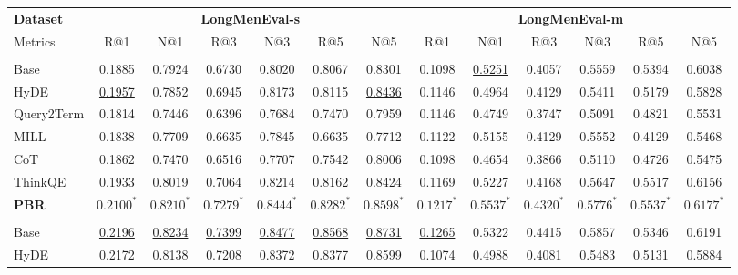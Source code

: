 \begin{table}[ht]
\centering
\small
\setlength\tabcolsep{2.2pt}  %
\renewcommand{\arraystretch}{0.80} %
\begin{tabular}{lcccccccccccc}
\toprule
 \textbf{Dataset} & \multicolumn{6}{c}{\textbf{LongMenEval-s}} & \multicolumn{6}{c}{\textbf{LongMenEval-m}} \\
 \cmidrule(lr){2-7} \cmidrule(lr){8-13}
Metrics & R@1 & N@1 & R@3 & N@3 & R@5 & N@5 & R@1 & N@1 & R@3 & N@3 & R@5 & N@5 \\
\midrule
\rowcolor{gray!15}
\multicolumn{13}{c}{\textit{multi-qa-MiniLM-L6-cos-v1}} \\
Base     & 0.1885 & 0.7924 & 0.6730 & 0.8020 & 0.8067 & 0.8301 & 0.1098 & \underline{0.5251} & 0.4057 & 0.5559 & 0.5394 & 0.6038 \\
HyDE     & \underline{0.1957} & 0.7852 & 0.6945 & 0.8173 & 0.8115 & \underline{0.8436} & 0.1146 & 0.4964 & 0.4129 & 0.5411 & 0.5179 & 0.5828 \\
Query2Term & 0.1814 & 0.7446 & 0.6396 & 0.7684 & 0.7470 & 0.7959 & 0.1146 & 0.4749 & 0.3747 & 0.5091 & 0.4821 & 0.5531 \\
MILL     & 0.1838 & 0.7709 & 0.6635 & 0.7845 & 0.6635 & 0.7712 & 0.1122 & 0.5155 & 0.4129 & 0.5552 & 0.4129 & 0.5468 \\
CoT      & 0.1862 & 0.7470 & 0.6516 & 0.7707 & 0.7542 & 0.8006 & 0.1098 & 0.4654 & 0.3866 & 0.5110 & 0.4726 & 0.5475 \\
ThinkQE & 0.1933 & \underline{0.8019} & \underline{0.7064} & \underline{0.8214} & \underline{0.8162 }& 0.8424 & \underline{0.1169} & 0.5227 & \underline{0.4168} & \underline{0.5647} & \underline{0.5517} & \underline{0.6156} \\
\textbf{PBR} & $\mathbf{0.2100^*}$ & $\mathbf{0.8210^*}$ & $\mathbf{0.7279^*}$ & $\mathbf{0.8444^*}$ & $\mathbf{0.8282^*}$ & $\mathbf{0.8598^*}$ & $\mathbf{0.1217^*}$ & $\mathbf{0.5537^*}$ & $\mathbf{0.4320^*}$ & $\mathbf{0.5776^*}$ & $\mathbf{0.5537^*}$ & $\mathbf{0.6177^*}$ \\
\midrule
\rowcolor{gray!15}
\multicolumn{13}{c}{\textit{all-MiniLM-L6-v2}}\\
Base     & \underline{0.2196} & \underline{0.8234} & \underline{0.7399} & \underline{0.8477} & \underline{0.8568} & \underline{0.8731} & \underline{0.1265} & 0.5322 & 0.4415 & 0.5857 & 0.5346 & 0.6191 \\
HyDE     & 0.2172 & 0.8138 & 0.7208 & 0.8372 & 0.8377 & 0.8599 & 0.1074 & 0.4988 & 0.4081 & 0.5483 & 0.5131 & 0.5884 \\

\end{tabular}
\end{table}
